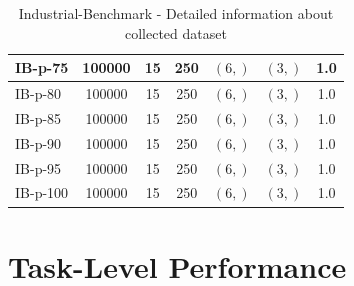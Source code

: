 \documentclass{article}
\theoremstyle{plain}
\theoremstyle{definition}
\theoremstyle{remark}
\begin{document}
\begin{table}[H]
{\begin{tabular}{|l|c|c|c|c|c|c|}
    \hline
    IB-p-75 & 100000 & 15 & 250 & $(6,)$ & $(3,)$ & 1.0 \\
    \hline
    IB-p-80 & 100000 & 15 & 250 & $(6,)$ & $(3,)$ & 1.0 \\
    \hline
    IB-p-85 & 100000 & 15 & 250 & $(6,)$ & $(3,)$ & 1.0 \\
    \hline
    IB-p-90 & 100000 & 15 & 250 & $(6,)$ & $(3,)$ & 1.0 \\
    \hline
    IB-p-95 & 100000 & 15 & 250 & $(6,)$ & $(3,)$ & 1.0 \\
    \hline
    IB-p-100 & 100000 & 15 & 250 & $(6,)$ & $(3,)$ & 1.0 \\
    \hline
  \end{tabular}}
  \caption{Industrial-Benchmark - Detailed information about collected dataset}
  \label{dataset-info:industrial-benchmark}
\end{table}


\section{Task-Level Performance}\label{appendix:performance}
\end{document}
